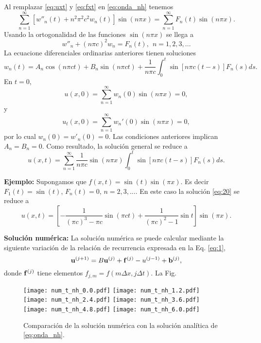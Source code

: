 \documentclass[11pt]{article}
\begin{document}
Al remplazar \eqref{eq:uxt} y \eqref{eq:fxt} en \eqref{eq:onda_nh} tenemos
\begin{equation}
  \label{eq:14}
  \sum_{n=1}^\infty \left[w''_n(t) + n^2\pi^2c^2 w_n(t)\right]\sin(n\pi x) = \sum_{n=1}^\infty F_n(t)\sin(n\pi x).
\end{equation}
Usando la ortogonalidad de las funciones $\sin(n\pi x)$ se llega a
\begin{equation}
  \label{eq:15}
  w''_n + (n\pi c)^2 w_n = F_n(t),~~n=1,2,3,...
\end{equation}
La ecuacione diferenciales ordinarias anteriores tienen soluciones 
\begin{equation}
  \label{eq:17}
  w_n(t) = A_n \cos(n\pi ct) + B_n \sin(n\pi ct) + \frac{1}{n\pi c}\int_0^t \sin[n\pi c(t-s)]F_n(s)ds.
\end{equation}
En $t=0$,
\begin{equation}
  \label{eq:18}
  u(x,0) = \sum_{n=1}^\infty w_n(0)\sin(n\pi x) = 0,
\end{equation}
y
\begin{equation}
  \label{eq:18}
  u_t(x,0) = \sum_{n=1}^\infty w_n'(0)\sin(n\pi x) = 0,
\end{equation}
por lo cual $w_n(0) = w'_n(0)=0$. Las condiciones anteriores implican $A_n = B_n = 0$. Como resultado, la soluci\'on general se reduce a
\begin{equation}
  \label{eq:20}
  u(x,t) = \sum_{n=1}^\infty \frac{1}{n\pi c} \sin(n\pi x) \int_0^t \sin[n\pi c(t-s)]F_n(s)ds.
\end{equation}

{\bf Ejemplo:} Supongamos que $f(x,t) = \sin(t)\sin(\pi x)$. Es decir $F_1(t) = \sin(t)$, $F_n(t) = 0$, $n=2,3,...$. En este caso la soluci\'on \eqref{eq:20} se reduce a 
\label{eq:21}
\begin{equation}
  u(x,t) = \left[-\frac{1}{(\pi c)^3 - \pi c}\sin(\pi ct) +
    \frac{1}{(\pi c)^2 - 1}\sin t \right]
  \sin(\pi x).
\end{equation}

{\bf Soluci\'on num\'erica:} La soluci\'on num\'erica se puede calcular mediante la siguiente variaci\'on de la relaci\'on de recurrencia expresada en la Eq. \eqref{eq:1},
\begin{equation}
  \label{eq:22}
    {\bf u}^{(j+1)} = B{\bf u}^{(j)} + {\bf f}^{(j)}- u^{(j-1)} + {\bf b}^{(j)},
\end{equation}
donde ${\bf f}^{(j)}$ tiene elementos $f_{j,m} = f(m\Delta x, j\Delta t)$. La Fig.

\begin{figure}[h]
  \centering
    \texttt{[image: num\_t\_nh\_0.0.pdf]} 
  \texttt{[image: num\_t\_nh\_1.2.pdf]} \\
  \texttt{[image: num\_t\_nh\_2.4.pdf]} 
  \texttt{[image: num\_t\_nh\_3.6.pdf]} \\
  \texttt{[image: num\_t\_nh\_4.8.pdf]}
  \texttt{[image: num\_t\_nh\_6.0.pdf]}
  \caption{Comparaci\'on de la soluci\'on num\'erica con la soluci\'on anal\'itica de \eqref{eq:onda_nh}.}
  \label{fig:num}
\end{figure}
\end{document}
